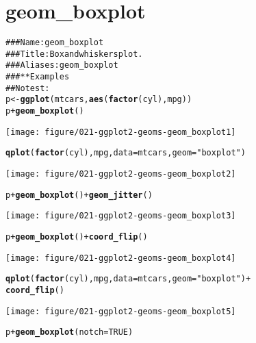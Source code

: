 \documentclass[a4paper,titlepage]{tufte-handout}\usepackage{graphicx, color}
\makeatletter
\def\maxwidth{ %
  \ifdim\Gin@nat@width>\linewidth
    \linewidth
  \else
    \Gin@nat@width
  \fi
}
\newcommand{\hlfunctioncall}[1]{\textcolor[rgb]{0.501960784313725,0,0.329411764705882}{\textbf{#1}}}%
\newcommand{\hlstring}[1]{\textcolor[rgb]{0.6,0.6,1}{#1}}%
\newcommand{\hlcomment}[1]{\textcolor[rgb]{0.180392156862745,0.6,0.341176470588235}{#1}}%
\newenvironment{kframe}{%
 \def\at@end@of@kframe{}%
 \ifinner\ifhmode%
  \def\at@end@of@kframe{\end{minipage}}%
  \begin{minipage}{\columnwidth}%
 \fi\fi%
 \def\FrameCommand##1{\hskip\@totalleftmargin \hskip-\fboxsep
 \colorbox{shadecolor}{##1}\hskip-\fboxsep
     \hskip-\linewidth \hskip-\@totalleftmargin \hskip\columnwidth}%
 \MakeFramed {\advance\hsize-\width
   \@totalleftmargin\z@ \linewidth\hsize
   \@setminipage}}%
 {\par\unskip\endMakeFramed%
 \at@end@of@kframe}
\newenvironment{knitrout}{}{} %
\makeatother
\begin{document}
\section{geom\_boxplot}

\begin{knitrout}
\color{fgcolor}\begin{kframe}
\begin{alltt}
\hlcomment{### Name: geom_boxplot}
\hlcomment{### Title: Box and whiskers plot.}
\hlcomment{### Aliases: geom_boxplot}
\hlcomment{### ** Examples}
\hlcomment{## No test: }
p <- \hlfunctioncall{ggplot}(mtcars, \hlfunctioncall{aes}(\hlfunctioncall{factor}(cyl), mpg))
p + \hlfunctioncall{geom_boxplot}()
\end{alltt}
\end{kframe}\texttt{[image: figure/021-ggplot2-geoms-geom\_boxplot1]} \begin{kframe}\begin{alltt}
\hlfunctioncall{qplot}(\hlfunctioncall{factor}(cyl), mpg, data = mtcars, geom = \hlstring{"boxplot"})
\end{alltt}
\end{kframe}\texttt{[image: figure/021-ggplot2-geoms-geom\_boxplot2]} \begin{kframe}\begin{alltt}
p + \hlfunctioncall{geom_boxplot}() + \hlfunctioncall{geom_jitter}()
\end{alltt}
\end{kframe}\texttt{[image: figure/021-ggplot2-geoms-geom\_boxplot3]} \begin{kframe}\begin{alltt}
p + \hlfunctioncall{geom_boxplot}() + \hlfunctioncall{coord_flip}()
\end{alltt}
\end{kframe}\texttt{[image: figure/021-ggplot2-geoms-geom\_boxplot4]} \begin{kframe}\begin{alltt}
\hlfunctioncall{qplot}(\hlfunctioncall{factor}(cyl), mpg, data = mtcars, geom = \hlstring{"boxplot"}) +
  \hlfunctioncall{coord_flip}()
\end{alltt}
\end{kframe}\texttt{[image: figure/021-ggplot2-geoms-geom\_boxplot5]} \begin{kframe}\begin{alltt}
p + \hlfunctioncall{geom_boxplot}(notch = TRUE)
\end{alltt}



\end{kframe}
\end{knitrout}
\end{document}
